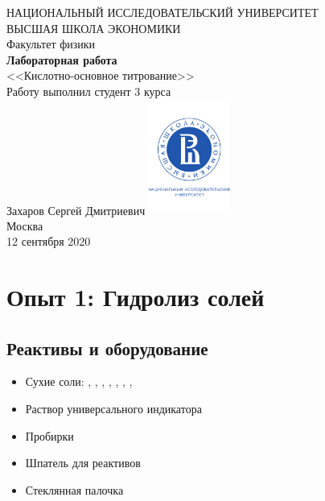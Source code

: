 \documentclass[a4paper, 12pt]{article}
\begin{document}
	\begin{titlepage}
		\begin{center}
			$$$$
			$$$$
			$$$$
			$$$$
			{\Large{НАЦИОНАЛЬНЫЙ ИССЛЕДОВАТЕЛЬСКИЙ УНИВЕРСИТЕТ}}\\
			\vspace{0.1cm}
			{\Large{ВЫСШАЯ ШКОЛА ЭКОНОМИКИ}}\\
			\vspace{0.25cm}
			{\large{Факультет физики}}\\
			\vspace{5.5cm}
			{\Huge\textbf{{Лабораторная работа}}}\\%
			\vspace{1cm}
			{\LARGE{<<Кислотно-основное титрование>>}}\\%
			\vspace{2cm}
			{Работу выполнил студент 3 курса}\\
			{Захаров Сергей Дмитриевич}
			\vfill
			\includegraphics[width = 0.2\textwidth]{HSElogo}\\
			\vfill
			Москва\\
			12 сентября 2020
		\end{center}
	\end{titlepage}

\tableofcontents

\newpage

\section{Опыт 1: Гидролиз солей}

\subsection{Реактивы и оборудование}

\begin{itemize}
	\item Сухие соли: , , , , , , , 
	
	\item Раствор универсального индикатора
	
	\item Пробирки
	
	\item Шпатель для реактивов
	
	\item Стеклянная палочка
\end{itemize}
\end{document}

